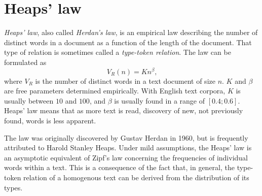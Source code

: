   \section{Heaps' law}
  
    \emph{Heaps' law}, also called \emph{Herdan's law}, is an empirical law describing the number of distinct words in a document as a function of the length of the document. That type of relation is sometimes called a \emph{type-token relation}. The law can be formulated as
    \begin{equation}
      V_R(n) = Kn^\beta\mbox{,}
    \end{equation}
    where $V_R$ is the number of distinct words in a text document of size $n$. $K$ and $\beta$ are free parameters determined empirically. With English text corpora, $K$ is usually between $10$ and $100$, and $\beta$ is usually found in a range of $[0.4; 0.6]$. Heaps' law means that as more text is read, discovery of new, not previously found, words is less apparent.

    The law was originally discovered by Gustav Herdan in 1960\cite{Egghe2007}, but is frequently attributed to Harold Stanley Heaps. Under mild assumptions, the Heaps' law is an asymptotic equivalent of Zipf's law concerning the frequencies of individual words within a text\cite{Kornai1999}. This is a consequence of the fact that, in general, the type-token relation of a homogenous text can be derived from the distribution of its types\cite{Milicka2009}.
